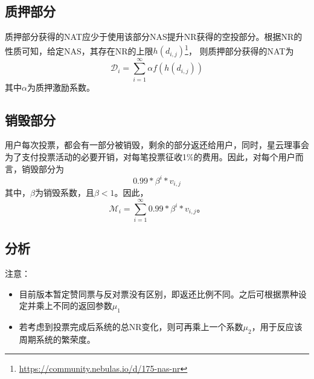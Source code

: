 \subsection{质押部分}
质押部分获得的NAT应少于使用该部分NAS提升NR获得的空投部分。根据NR的性质可知，给定NAS，其存在NR的上限$h(d_{i,j})$\footnote{\url{https://community.nebulas.io/d/175-nas-nr}}，
则质押部分获得的NAT为
\[
\mathcal{D}_i = \sum_{i=1}^{\infty}\alpha f(h(d_{i,j}))
\]
\noindent 其中$\alpha$为质押激励系数。


\subsection{销毁部分}
用户每次投票，都会有一部分被销毁，剩余的部分返还给用户，同时，星云理事会为了支付投票活动的必要开销，对每笔投票征收1\%的费用。因此，对每个用户而言，销毁部分为
\[
0.99 * \beta^i * v_{i,j}
\]
\noindent 其中，$\beta$为销毁系数，且$\beta < 1$。因此，
\[
    \mathcal{M}_i = \sum_{i=1}^{\infty} 0.99 * \beta^i * v_{i,j} 。
\]

\subsection{分析}

注意：
\begin{itemize}
\item 目前版本暂定赞同票与反对票没有区别，即返还比例不同。之后可根据票种设定并乘上不同的返回参数$\mu_1$
\item 若考虑到投票完成后系统的总NR变化，则可再乘上一个系数$\mu_2$，用于反应该周期系统的繁荣度。
\end{itemize}


